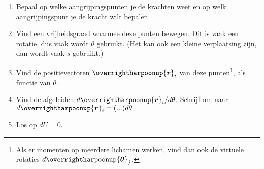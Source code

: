 \documentclass{article}
\renewcommand{\v}[1]{\overrightharpoonup{\bm{#1}}}
\begin{document}
\begin{enumerate}
    \item Bepaal op welke aangrijpingspunten je de krachten weet en op welk aangrijpingspunt je de kracht wilt bepalen.
    \item Vind een vrijheidsgraad waarmee deze punten bewegen. Dit is vaak een rotatie, dus vaak wordt $\theta$ gebruikt. (Het kan ook een kleine verplaatsing zijn, dan wordt vaak $s$ gebruikt.)
    \item Vind de positievectoren $\v{r}_i$ van deze punten\footnote{Als er momenten op meerdere lichamen werken, vind dan ook de virtuele rotaties $d
    \v{\theta}_j$.}, als functie van $\theta$. 
    \item Vind de afgeleiden $d\v{r}_i/d\theta$. Schrijf om naar $d\v{r}_i=(...)d\theta$
    \item Los op $dU = 0$.
\end{enumerate}
\end{document}
